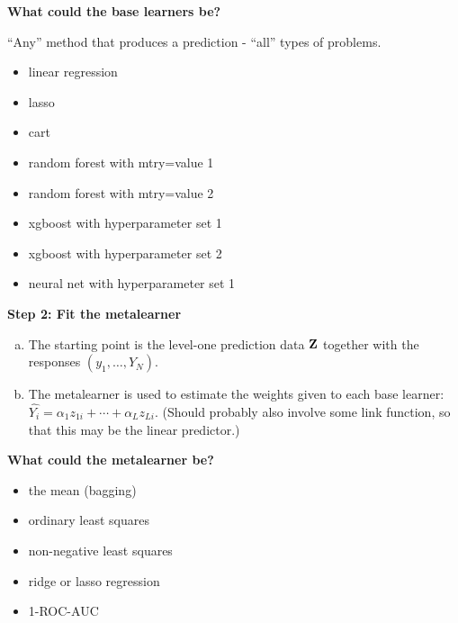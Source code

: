 \documentclass[
  ignorenonframetext,
]{beamer}
\providecommand{\tightlist}{%
  \setlength{\itemsep}{0pt}\setlength{\parskip}{0pt}}
\begin{document}
\begin{frame}

\textbf{What could the base learners be?}

``Any'' method that produces a prediction - ``all'' types of problems.

\begin{itemize}
\tightlist
\item
  linear regression
\item
  lasso
\item
  cart
\item
  random forest with mtry=value 1
\item
  random forest with mtry=value 2
\item
  xgboost with hyperparameter set 1
\item
  xgboost with hyperparameter set 2
\item
  neural net with hyperparameter set 1
\end{itemize}

\end{frame}

\begin{frame}

\textbf{Step 2: Fit the metalearner}

\begin{enumerate}
[a)]
\tightlist
\item
  The starting point is the level-one prediction data \({\bf Z}\)
  together with the responses \((y_1,\ldots ,Y_N)\).
\item
  The metalearner is used to estimate the weights given to each base
  learner: \(\hat{Y_i}=\alpha_1 z_{1i}+ \cdots + \alpha_L z_{Li}\).
  (Should probably also involve some link function, so that this may be
  the linear predictor.)
\end{enumerate}

\end{frame}

\begin{frame}

\textbf{What could the metalearner be?}

\begin{itemize}
\tightlist
\item
  the mean (bagging)
\item
  ordinary least squares
\item
  non-negative least squares
\item
  ridge or lasso regression
\item
  1-ROC-AUC
\end{itemize}

\end{frame}
\end{document}
